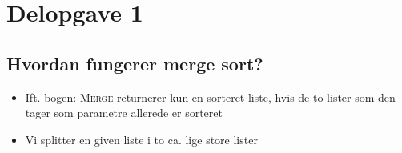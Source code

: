 \section{Delopgave 1}\label{sec:delopgave-13}

\subsection{Hvordan fungerer merge sort?}\label{subsec:hvordan-fungerer-merge-sort?}

\begin{itemize}
    \item Ift. bogen: \textsc{Merge} returnerer kun en sorteret liste, hvis de to lister som den tager som parametre
    allerede er sorteret
    \item Vi splitter en given liste i to ca. lige store lister
\end{itemize}
